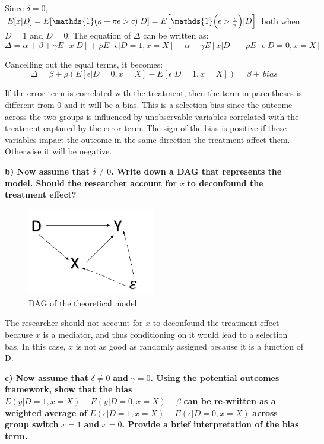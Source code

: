 \documentclass[a4paper,12pt,oneside,English]{article}
\begin{document}
Since $\delta=0$, $E[x|D]=E[\mathds{1}(\kappa+\pi\epsilon>c)|D]=E\Bigl[\mathds{1}\Bigl(\epsilon>\frac{c}{\pi}\Bigr)|D\Bigr]$ both when $D=1$ and $D=0$. The equation of $\Delta$ can be written as:
\begin{equation}
    \Delta=\alpha+\beta+\gamma E[x|D] + \rho E[\epsilon|D=1, x=X]-\alpha-\gamma E[x|D]-\rho E[\epsilon|D=0, x=X]
\end{equation}

Cancelling out the equal terms, it becomes:
\begin{equation}
    \Delta=\beta+\rho (E[\epsilon|D=0,x=X]-E[\epsilon|D=1,x=X])=\beta+\,bias
\end{equation}

If the error term is correlated with the treatment, then the term in parentheses is different from 0 and it will be a bias. This is a selection bias since the outcome across the two groups is influenced by unobservable variables correlated with the treatment captured by the error term. The sign of the bias is positive if these variables impact the outcome in the same direction the treatment affect them. Otherwise it will be negative.

\textbf{b) Now assume that }$\delta \neq 0$\textbf{. Write down a DAG that represents the model. Should the researcher account for }$x$ \textbf{to deconfound the treatment effect?}\\

\begin{figure}[h!]
    \centering
    \includegraphics[width=0.5\textwidth]{Figure 1B.png}
    \caption{DAG of the theoretical model}
    \label{fig 1}
\end{figure}

The researcher should not account for $x$ to deconfound the treatment effect because $x$ is a mediator, and thus conditioning on it would lead to a selection bas. In this case, $x$ is not as good as randomly assigned because it is a function of D.

\textbf{c) Now assume that }$\delta \not= 0$ \textbf{and} $\gamma = 0$\textbf{. Using the potential outcomes framework, show that the bias} $E(y|D = 1,x = X) - E(y|D = 0,x = X) - \beta$ \textbf{can be re-written as a weighted average of} $E(\epsilon|D=1,x=X)-E(\epsilon|D=0,x=X)$ \textbf{across group switch }$x=1$ \textbf{and} $x=0$\textbf{. Provide a brief interpretation of the bias term.}\\
\end{document}
